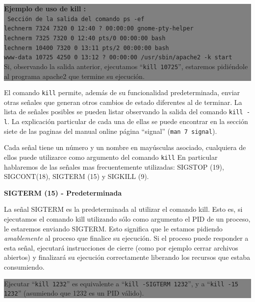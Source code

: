 \documentclass[12pt]{article}
\begin{document}
\colorbox{grey}{\parbox[t]{0.95\linewidth}{ \vspace*{0.5cm} { 
{\bf Ejemplo de uso de kill :} \\
{\tt
Sección de la salida del comando \texttt{ps -ef}\\
lechnerm  7324  7320  0 12:40 ?        00:00:00 gnome-pty-helper \\
lechnerm  7325  7320  0 12:40 pts/0    00:00:00 bash\\
lechnerm 10400  7320  0 13:11 pts/2    00:00:00 bash\\
www-data 10725  4250  0 13:12 ?        00:00:00 /usr/sbin/apache2 -k start \\
}
Si, observando la salida anterior, ejecutamos ``\texttt{kill 10725}'', 
estaremos pidiéndole al programa apache2 que termine su ejecución. 
} \vspace*{0.5cm} } } 
	
El comando \texttt{kill} permite, además de su funcionalidad predeterminada,
enviar otras señales que generan otros cambios de estado diferentes al de 
terminar. La lista de señales posibles se pueden listar observando la 
salida del comando \texttt{kill -l}. La explicación particular de cada 
una de ellas se puede encontrar en la sección siete de las paginas del 
manual online página ``signal'' (\texttt{man 7 signal}).  

Cada señal tiene un número y un nombre en mayúsculas asociado, cualquiera
de ellos puede utilizarce como argumento del comando \texttt{kill}  
En particular hablaremos de las señales mas frecuentemente utilizadas: 
SIGSTOP (19), SIGCONT(18), SIGTERM (15) y  SIGKILL (9).  

\textbf{SIGTERM (15) - Predeterminada}

La señal SIGTERM es la predeterminada al utilizar el comando kill. Esto 
es, si ejecutamos el comando kill utilizando sólo como argumento el PID 
de un proceso, le estaremos enviando SIGTERM. Esto significa que le estamos
pidiendo \textit{amablemente} al proceso que finalice su ejecución. 
Si el proceso puede responder a esta señal, ejecutará instrucciones de 
cierre (como por ejemplo cerrar archivos abiertos) y finalizará su 
ejecución correctamente liberando los recursos que estaba consumiendo. 

\colorbox{grey}{\parbox[t]{0.95\linewidth}{ \vspace*{0.5cm} { 
{\bf }
Ejecutar ``\texttt{kill 1232}'' es equivalente a ``\texttt{kill -SIGTERM 
1232}'', y a ``\texttt{kill -15 1232}'' (asumiendo que 1232 es un PID 
válido). 
} \vspace*{0.5cm} } } 
\end{document}

